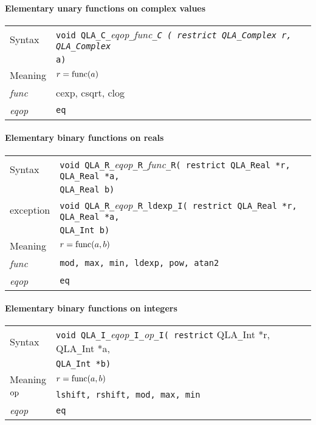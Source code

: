 \documentclass{article}
\newcommand{\op}{\mathop{\rm op}}
\newcommand{\tReal}{QLA\ttdash Real }
\newcommand{\tComplex}{QLA\ttdash Complex }
\newcommand{\tInt}{QLA\ttdash Int }
\newcommand{\namespace}{QLA}
\newcommand{\ttdash}{{\tt \_}}
\newcommand{\extraarg}{}
\newcommand{\protoUnaryQualCC}[1]{{\tt void \namespace}\ttdash{\tt C}\ttdash{\it eqop}\ttdash#1\ttdash{\tt C ( restrict \tComplex }{\tt *r, \tComplex }\\
       &  {\tt *a\extraarg)}}
\begin{document}
\paragraph{Elementary unary functions on complex values}

\begin{flushleft}
  \begin{tabular}{|l|l|}
  \hline
  Syntax      & \protoUnaryQualCC{\it func}  \\
  \hline
  Meaning     & $r = {\rm func}(a)$ \\
  \hline
  {\it func}  & cexp, csqrt, clog \\
  \hline
  {\it eqop}  & {\tt eq} \\
  \hline
  \end{tabular}
\end{flushleft}

\paragraph{Elementary binary functions on reals}

\begin{flushleft}
  \begin{tabular}{|l|l|}
  \hline
  Syntax      & {\tt void \namespace}\ttdash{\tt R}\ttdash{\it eqop}\ttdash{\tt R}\ttdash{\it func}\ttdash{\tt R( restrict \tReal *r, \tReal *a,}\\
              & {\tt \tReal }{\tt *b\extraarg)} \\
  exception   & {\tt void \namespace}\ttdash{\tt R}\ttdash{\it eqop}\ttdash{\tt R}\ttdash{\tt ldexp}\ttdash{\tt I( restrict \tReal *r, \tReal *a,}\\
              & {\tt \tInt }{\tt *b\extraarg)} \\
  \hline
  Meaning     & $r = {\rm func}(a,b)$ \\
  \hline
  {\it func}  & {\tt  mod, max, min, ldexp, pow, atan2} \\
  \hline
  {\it eqop}  & {\tt eq} \\
  \hline
  \end{tabular}
\end{flushleft}

\paragraph{Elementary binary functions on integers}

\begin{flushleft}
  \begin{tabular}{|l|l|}
  \hline
  Syntax      & {\tt void \namespace}\ttdash{\tt I}\ttdash{\it eqop}\ttdash{\tt I}\ttdash{\it op}\ttdash{\tt I( restrict}{ \tInt *r, \tInt *a,} \\
              & {\tt \tInt *b\extraarg)} \\
  \hline
  Meaning     & $r = {\rm func}(a,b)$\\
  \hline
  $\op$       & {\tt lshift, rshift, mod, max, min} \\
  \hline
  {\it eqop}  & {\tt eq} \\
  \hline
  \end{tabular}
\end{flushleft}
\end{document}
